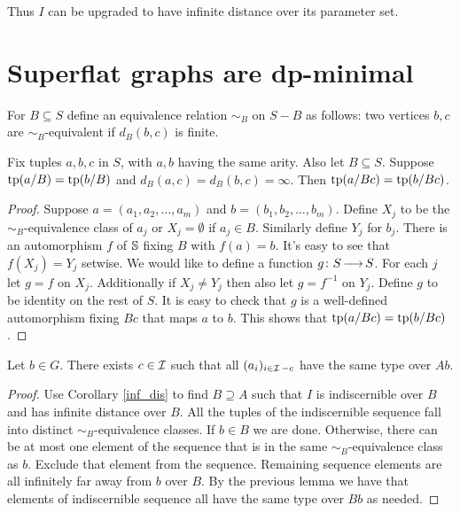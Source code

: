 Thus $I$ can be upgraded to have infinite distance over its parameter set.

\section{Superflat graphs are dp-minimal}

\begin{Definition}
  For $B \subseteq S$ define an equivalence relation $\sim_B$ on $S - B$ as follows:
  two vertices $b,c$ are $\sim_B$-equivalent if $d_B(b,c)$ is finite.
\end{Definition}

\begin{Lemma}
  Fix tuples $a,b,c$ in $S$, with $a,b$ having the same arity.
  Also let $B \subseteq S$.
  Suppose $\operatorname{tp}(a/B) = \operatorname{tp}(b/B)$ and $d_B(a, c) = d_B(b, c) = \infty$.
  Then $\operatorname{tp}(a/Bc) = \operatorname{tp}(b/Bc)$.
\end{Lemma}

\begin{proof}
  Suppose $a = (a_1, a_2, \ldots, a_m)$ and $b = (b_1, b_2, \ldots, b_m)$.
  Define $X_j$ to be the $\sim_B$-equivalence class of $a_j$ or $X_j = \emptyset$ if $a_j \in B$.
  Similarly define $Y_j$ for $b_j$.
  There is an automorphism $f$ of $\mathbb S$ fixing $B$ with $f(a) = b$.
  It's easy to see that $f(X_j) = Y_j$ setwise.
  We would like to define a function $g \colon S \operatorname{\longrightarrow} S$.
  For each $j$ let $g = f$ on $X_j$.
  Additionally if $X_j \neq Y_j$ then also let $g = f^{-1}$ on $Y_j$.
  Define $g$ to be identity on the rest of $S$.
  It is easy to check that $g$ is a well-defined automorphism fixing $Bc$ that maps $a$ to $b$.
  This shows that $\operatorname{tp}(a/Bc) = \operatorname{tp}(b/Bc)$.
\end{proof}

\begin{Lemma} \label{exclude}
  Let $b \in G$.
  There exists $c \in \operatorname{\mathcal I}$ such that all $(a_i)_{i \in \operatorname{\mathcal I} - c}$ have the same type over $Ab$.
\end{Lemma}

\begin{proof}
  Use Corollary \ref{inf_dis} to find $B \supseteq A$ such that $I$ is indiscernible over $B$ and has infinite distance over $B$.
  All the tuples of the indiscernible sequence fall into distinct $\sim_B$-equivalence classes.
  If $b \in B$ we are done.
  Otherwise, there can be at most one element of the sequence that is in the same $\sim_B$-equivalence class as $b$.
  Exclude that element from the sequence.
  Remaining sequence elements are all infinitely far away from $b$ over $B$.
  By the previous lemma we have that elements of indiscernible sequence all have the same type over $Bb$ as needed.
\end{proof}


